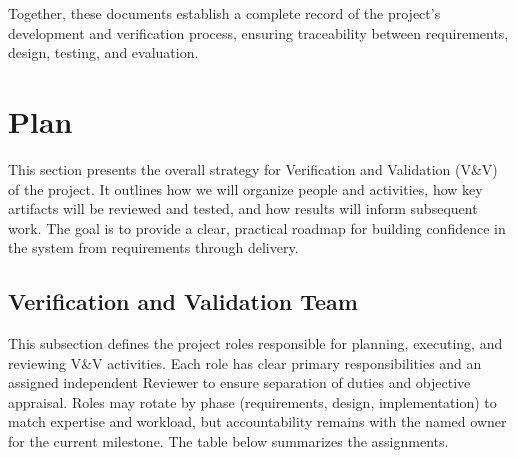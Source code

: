 \documentclass[12pt, titlepage]{article}
\begin{document}
Together, these documents establish a complete record of the project’s development and verification process, ensuring traceability between requirements, design, testing, and evaluation.

\section{Plan}

This section presents the overall strategy for Verification and Validation (V\&V) of the project. It outlines how we will organize people and activities, how key artifacts will be reviewed and tested, and how results will inform subsequent work. The goal is to provide a clear, practical roadmap for building confidence in the system from requirements through delivery.


\subsection{Verification and Validation Team}

This subsection defines the project roles responsible for planning, executing, and reviewing V\&V activities. Each role has clear
primary responsibilities and an assigned independent Reviewer to ensure separation of duties and objective appraisal.
Roles may rotate by phase (requirements, design, implementation) to match expertise and workload, but accountability remains
with the named owner for the current milestone. The table below summarizes the assignments.
\end{document}
